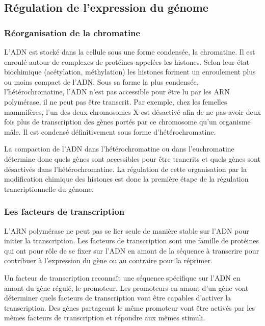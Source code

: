 \documentclass{report}
\begin{document}
\subsection{Régulation de l'expression du génome}

\subsubsection{Réorganisation de la chromatine}

L'ADN est stocké dans la cellule sous une forme condensée, la chromatine. Il est enroulé autour de complexes de protéines appelées les histones. Selon leur état biochimique (acétylation, méthylation) les histones forment un enroulement plus ou moins compact de l'ADN. 
Sous sa forme la plus condensée, l'hétérochromatine, l'ADN n'est pas accessible pour être lu par les ARN polymérase, il ne peut pas être transcrit. Par exemple, chez les femelles mammifères, l'un des deux chromosomes X est désactivé afin de ne pas avoir deux fois plus de transcription des gènes portés par ce chromosome qu'un organisme mâle. Il est condensé définitivement sous forme d'hétérochromatine. 

La compaction de l'ADN dans l'hétérochromatine ou dans l'euchromatine détermine donc quels gènes sont accessibles pour être trancrits et quels gènes sont désactivés dans l'hétérochromatine. 
La régulation de cette organisation par la modification chimique des histones est donc la première étape de la régulation trancriptionnelle du génome. 

\subsubsection{Les facteurs de transcription}

L'ARN polymérase ne peut pas se lier seule de manière stable sur l'ADN pour initier la transcription. 
Les facteurs de transcription sont une famille de protéines qui ont pour rôle de se fixer sur l'ADN en amont de la séquence à transcrire pour contribuer à l'expression du gène ou au contraire pour la réprimer. 

Un facteur de transcription reconnaît une séquence spécifique sur l'ADN en amont du gène régulé, le promoteur. Les promoteurs en amont d'un gène vont déterminer quels facteurs de transcription vont être capables d'activer la transcription. Des gènes partageant le même promoteur vont être activés par les mêmes facteurs de transcription et répondre aux mêmes stimuli.  
\end{document}

